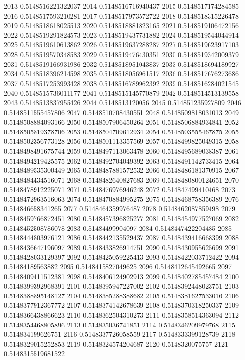 2013 0.5148516221322037
2014 0.5148516716940437
2015 0.5148517174284585
2016 0.5148517593210281
2017 0.5148517973572722
2018 0.5148518315226478
2019 0.5148518618025513
2020 0.5148518881823165
2021 0.5148519106472156
2022 0.5148519291824573
2023 0.5148519437731882
2024 0.5148519544044914
2025 0.5148519610613862
2026 0.5148519637288287
2027 0.5148519623917103
2028 0.5148519570348583
2029 0.5148519476430351
2030 0.5148519342009379
2031 0.5148519166931986
2032 0.5148518951043837
2033 0.5148518694189927
2034 0.5148518396214598
2035 0.5148518056961517
2036 0.5148517676273686
2037 0.5148517253993428
2038 0.5148516789962392
2039 0.5148516284021545
2040 0.5148515736011177
2041 0.5148515145770879
2042 0.5148514513139558
2043 0.5148513837955426
2044 0.5148513120056
2045 0.514851235927809
2046 0.5148511555457806
2047 0.5148510708430551
2048 0.5148509818031013
2049 0.5148508884093166
2050 0.5148507906450264
2051 0.5148506884934841
2052 0.5148505819378706
2053 0.5148504709612934
2054 0.5148503555467875
2055 0.5148502356773128
2056 0.5148501113357569
2057 0.5148499825049315
2058 0.5148498491675744
2059 0.5148497113063478
2060 0.5148495689038387
2061 0.5148494219425575
2062 0.5148492704049392
2063 0.5148491142733415
2064 0.5148489535300449
2065 0.5148487881572532
2066 0.5148486181370915
2067 0.5148484434516071
2068 0.5148482640827683
2069 0.5148480800124651
2070 0.5148478912225071
2071 0.5148476976946248
2072 0.514847499410468
2073 0.5148472963516063
2074 0.5148470884995275
2075 0.5148468758356389
2076 0.514846658341265
2077 0.5148464359976487
2078 0.5148462087859498
2079 0.5148459766872451
2080 0.5148457396825277
2081 0.5148454977527069
2082 0.5148452508786078
2083 0.51484499904097
2084 0.5148447422204485
2085 0.5148444803976121
2086 0.5148442135529437
2087 0.5148439416668399
2088 0.5148436647196097
2089 0.5148433826914751
2090 0.5148430955625699
2091 0.5148428033129397
2092 0.5148425059225413
2093 0.5148422033712422
2094 0.51484189563882
2095 0.5148415827049625
2096 0.5148412645492665
2097 0.5148409411512381
2098 0.5148406124902913
2099 0.5148402785457484
2100 0.5148399392968391
2101 0.5148395947227002
2102 0.5148392448023751
2103 0.5148388895148127
2104 0.5148385288388682
2105 0.5148381627533016
2106 0.5148377912367772
2107 0.5148374142678639
2108 0.5148370318250337
2109 0.5148366438866623
2110 0.5148362504310273
2111 0.5148358514363094
2112 0.5148354468805896
2113 0.514835036741851
2114 0.5148346209979768
2115 0.514834199626751
2116 0.5148337726058559
2117 0.5148333399128739
2118 0.5148329015252853
2119 0.5148324574204687
2120 0.5148320075757
2121 0.5148315519681522
